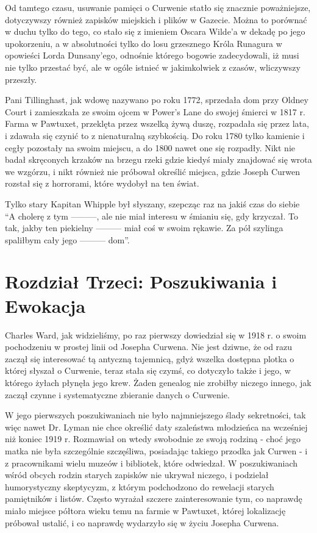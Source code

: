 Od tamtego czasu, usuwanie pamięci o Curwenie statło się znacznie poważniejsze, dotyczywszy również zapisków miejskich i plików w Gazecie. Można to porównać w duchu tylko do tego, co stało się z imieniem Oscara Wilde'a w dekadę po jego upokorzeniu, a w absolutności tylko do losu grzesznego Króla Runagura w opowieści Lorda Dunsany'ego, odnośnie którego bogowie zadecydowali, iż musi nie tylko przestać być, ale w ogóle istnieć w jakimkolwiek z czasów, wliczywszy przeszły. 

Pani Tillinghast, jak wdowę nazywano po roku 1772, sprzedała dom przy Oldney Court i zamieszkała ze swoim ojcem w Power's Lane do swojej śmierci w 1817 r. Farma w Pawtuxet, przeklęta przez wszelką żywą duszę, rozpadała się przez lata, i zdawała się czynić to z nienaturalną szybkością. Do roku 1780 tylko kamienie i cegły pozostały na swoim miejscu, a do 1800 nawet one się rozpadły. Nikt nie badał skręconych krzaków na brzegu rzeki gdzie kiedyś miały znajdować się wrota we wzgórzu, i nikt również nie próbował określić miejsca, gdzie Joseph Curwen rozstał się z horrorami, które wydobył na ten świat.

Tylko stary Kapitan Whipple był słyszany, szepcząc raz na jakiś czas do siebie ``A cholerę z tym ———, ale nie miał interesu w śmianiu się, gdy krzyczał. To tak, jakby ten piekielny ——— miał coś w swoim rękawie. Za pół szylinga spaliłbym cały jego ——— dom''.

\section{Rozdział Trzeci: Poszukiwania i Ewokacja}

Charles Ward, jak widzieliśmy, po raz pierwszy dowiedział się w 1918 r. o swoim pochodzeniu w prostej linii od Josepha Curwena. Nie jest dziwne, że od razu zaczął się interesować tą antyczną tajemnicą, gdyż wszelka dostępna plotka o której słyszał o Curwenie, teraz stała się czymś, co dotyczyło także i jego, w którego żyłach płynęła jego krew. Żaden genealog  nie zrobiłby niczego innego, jak zaczął czynne i systematyczne zbieranie danych o Curwenie. 

W jego pierwszych poszukiwaniach nie było najmniejszego ślady sekretności, tak więc nawet Dr. Lyman nie chce określić daty szaleństwa młodzieńca na wcześniej niż koniec 1919 r. Rozmawiał on wtedy swobodnie ze swoją rodziną - choć jego matka nie była szczególnie szczęśliwa, posiadając takiego przodka jak Curwen - i z pracownikami wielu muzeów i bibliotek, które odwiedzał. W poszukiwaniach wśród obcych rodzin starych zapisków nie ukrywał niczego, i podzielał humorystyczny skeptycyzm, z którym podchodzono do rewelacji starych pamiętników i listów. Często wyrażał szczere zainteresowanie tym, co naprawdę miało miejsce półtora wieku temu na farmie w Pawtuxet, której lokalizację próbował ustalić, i co naprawdę wydarzyło się w życiu Josepha Curwena.  

